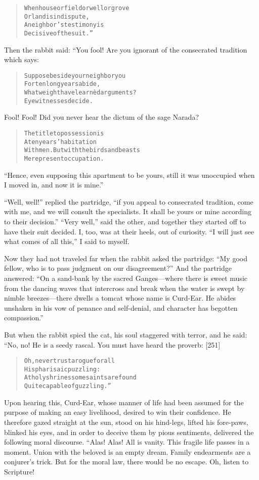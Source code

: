 \documentclass[article, twoside, 14pt]{memoir}
\renewenvironment{verbatim}{%
\begin{quote}%
\vskip -10pt%
\begin{alltt}\normalfont\large}{\end{alltt}%
\end{quote}%
\vskip -10pt
} %
\begin{document}
\begin{verbatim}
When house or field or well or grove
    Or land is in dispute,
A neighbor's testimony is
    Decisive of the suit.”
\end{verbatim}
Then the rabbit said: “You fool! Are you ignorant of the
consecrated tradition which says:

\begin{verbatim}
Suppose beside your neighbor you
    For ten long years abide,
What weight have learnèd arguments?
    Eyewitnesses decide.
\end{verbatim}
Fool! Fool! Did you never hear the dictum of the sage Narada?

\begin{verbatim}
The title to possession is
    A ten years' habitation
With men. But with the birds and beasts
    Mere present occupation.
\end{verbatim}
``Hence, even supposing this apartment to be yours, still it was unoccupied when I moved in, and now it is mine.''

``Well, well!'' replied the partridge,
``if you appeal to consecrated tradition, come with me, and we will consult the specialists. It shall be yours or mine according to their decision.''
``Very well,'' said the other, and together they started off to
have their suit decided. I, too, was at their heels, out of
curiosity. ``I will just see what comes of all this,'' I said to
myself.

Now they had not traveled far when the rabbit asked the partridge:
``My good fellow, who is to pass judgment on our disagreement?''
And the partridge answered:
``On a sand-bank by the sacred Ganges---where there is sweet music from the dancing waves that intercross and break when the water is swept by nimble breezes---there dwells a tomcat whose name is Curd-Ear. He abides unshaken in his vow of penance and self-denial, and character has begotten compassion.''

But when the rabbit spied the cat, his soul staggered with terror,
and he said: “No, no! He is a seedy rascal. You must have heard the
proverb: [251]

\begin{verbatim}
Oh, never trust a rogue for all
    His pharisaic puzzling:
At holy shrines some saints are found
    Quite capable of guzzling.”
\end{verbatim}
Upon hearing this, Curd-Ear, whose manner of life had been assumed
for the purpose of making an easy livelihood, desired to win their
confidence. He therefore gazed straight at the sun, stood on his
hind-legs, lifted his fore-paws, blinked his eyes, and in order to
deceive them by pious sentiments, delivered the following moral
discourse. “Alas! Alas! All is vanity. This fragile life passes in
a moment. Union with the beloved is an empty dream. Family
endearments are a conjurer's trick. But for the moral law, there
would be no escape. Oh, listen to Scripture!
\end{document}
